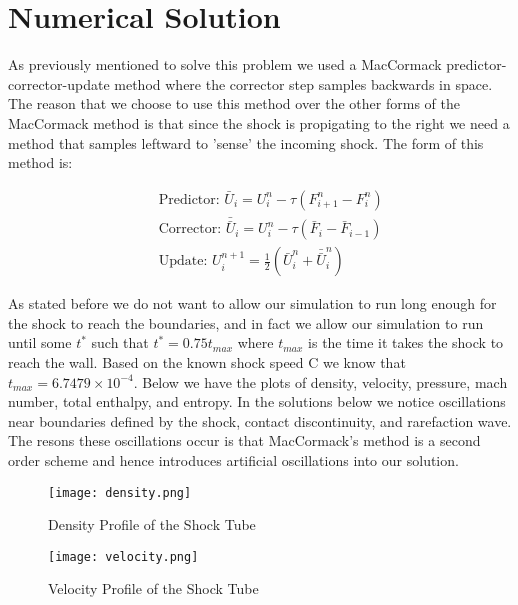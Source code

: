 \documentclass[a4paper,12pt,titlepage]{article}
\newcommand{\scale}{0.5}
\begin{document}
\section{Numerical Solution}

As previously mentioned to solve this problem we used a MacCormack predictor-corrector-update method where the corrector step samples backwards in space.  The reason that we choose to use this method over the other forms of the MacCormack method is that since the shock is propigating to the right we need a method that samples leftward to 'sense' the incoming shock.  The form of this method is:

\begin{eqnarray}
&&\mbox{Predictor: } \bar{U}_i = U_i^n - \tau(F_{i+1}^n-F_i^n)\nonumber \\
&&\mbox{Corrector: } \bar{\bar{U}}_i = U_i^n-\tau(\bar{F}_i-\bar{F}_{i-1})\nonumber \\
&&\mbox{Update:    } U_i^{n+1} = \frac{1}{2}(\bar{U}_i^n+\bar{\bar{U}}_i^n) 
\end{eqnarray}

As stated before we do not want to allow our simulation to run long enough for the shock to reach the boundaries, and in fact we allow our simulation to run until some $t^*$ such that $t^* = 0.75 t_{max}$ where $t_{max}$ is the time it takes the shock to reach the wall.  Based on the known shock speed C we know that $t_{max} = 6.7479 \times 10^{-4}$.  Below we have the plots of density, velocity, pressure, mach number, total enthalpy, and entropy.  In the solutions below we notice oscillations near boundaries defined by the shock, contact discontinuity, and rarefaction wave.  The resons these oscillations occur is that MacCormack's method is a second order scheme and hence introduces artificial oscillations into our solution.

\begin{figure}[H]
  \begin{center}
    \texttt{[image: density.png]}
    \caption{Density Profile of the Shock Tube}
  \end{center}
\end{figure}

\begin{figure}[H]
  \begin{center}
    \texttt{[image: velocity.png]}
    \caption{Velocity Profile of the Shock Tube}
  \end{center}
\end{figure}
\end{document}
